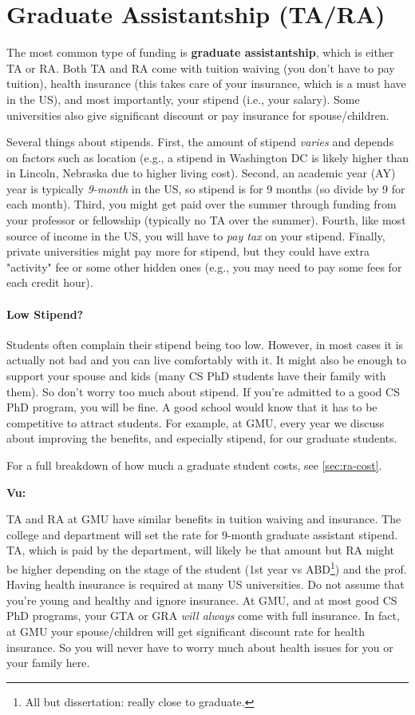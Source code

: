 \documentclass[oneside,11pt]{book}
\newenvironment{commentbox}[1][]{
  \small
  \begin{mybox}
    {\small \textbf{#1}}
  }{
  \end{mybox}
}
\begin{document}
\section{Graduate Assistantship (TA/RA)}\label{sec:ta-ra}
The most common type of funding is \textbf{graduate assistantship}, which is either TA or RA. Both TA and RA come with tuition waiving (you don't have to pay tuition), health insurance (this takes care of your insurance, which is a must have in the US), and most importantly, your stipend (i.e., your salary). Some universities also give significant discount or pay insurance for spouse/children.

Several things about stipends.  First, the amount of stipend \emph{varies} and depends on factors such as location (e.g., a stipend in Washington DC is likely higher than in Lincoln, Nebraska due to higher living cost). Second, an academic year (AY)  year is typically \emph{9-month} in the US, so stipend is for 9 months (so divide by 9 for each month). Third, you might get paid over the summer through funding from your professor or fellowship (typically no TA over the summer). Fourth, like most source of income in the US, you will have to \emph{pay tax} on your stipend.  Finally, private universities might pay more for stipend, but they could have extra "activity" fee or some other hidden ones (e.g., you may need to pay some fees for each credit hour).

\paragraph{Low Stipend?} Students often complain their stipend being too low. However, in most cases it is actually not bad and you can live comfortably with it.  It might also be enough to support your spouse and kids (many CS PhD students have their family with them). So don't worry too much about stipend.  If you're admitted to a good CS PhD program, you will be fine. A good school would know that it has to be competitive to attract students.  For example, at GMU, every year we discuss about improving the benefits, and especially stipend, for our graduate students. 

For a full breakdown of how much a graduate student costs, see \autoref{sec:ra-cost}.

\begin{commentbox}[Vu:]
  TA and RA at GMU have similar benefits in tuition waiving and insurance.  The college and department will set the rate for 9-month graduate assistant stipend.  TA, which is paid by the department, will likely be that amount but RA might be higher depending on the stage of the student (1st year vs ABD\footnote{All but dissertation: really close to graduate.}) and the prof.
  \tcblower
  Having health insurance is required at many US universities.  Do not assume that you're young and healthy and ignore insurance.  At GMU, and at most good CS PhD programs, your GTA or GRA \emph{will always} come with full insurance. In fact, at GMU your spouse/children will get significant discount rate for health insurance.  So you will never have to worry much about health issues for you or your family here.
\end{commentbox}
\end{document}
